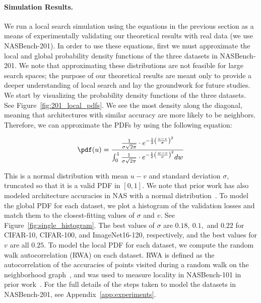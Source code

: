 \paragraph{Simulation Results.}
We run a local search simulation using the equations in
the previous section
as a means of experimentally validating our theoretical results
with real data (we use NASBench-201).
In order to use these equations, first we must approximate the local
and global probability density functions of the three 
datasets in NASBench-201.
We note that approximating these distributions are not feasible for large search
spaces; the purpose of our theoretical results are meant only to provide a deeper
understanding of local search and lay the groundwork for future studies.
We start by visualizing the probability density functions of the three datasets.
See Figure~\ref{fig:201_local_pdfs}.
We see the most density along the diagonal, meaning that architectures
with similar accuracy are more likely to be neighbors.
Therefore, we can approximate the PDFs by using the following equation:






\begin{equation}
\pdf(u)=\frac{
\frac{1}{\sigma\sqrt{2\pi}}\cdot 
e^{-\frac{1}{2}\left(\frac{u-v}{\sigma}\right)^2}
}
{
\int_0^1 \frac{1}{\sigma\sqrt{2\pi}}\cdot 
e^{-\frac{1}{2}\left(\frac{w-v}{\sigma}\right)^2}dw
}
\label{eq:normal_pdf}
\end{equation}



This is a normal distribution with mean $u-v$ 
and standard deviation $\sigma$, truncated so that it is a valid PDF
in $[0,1].$
We note that prior work has also modeled architecture accuracies in NAS with
a normal distribution~\citep{real2019regularized}.
To model the global PDF for each dataset,
we plot a histogram of the validation losses and match them to the closest-fitting
values of $\sigma$ and $v$.
See Figure~\ref{fig:single_histogram}.
The best values of $\sigma$ are $0.18,~0.1,$ and $0.22$ for CIFAR-10, CIFAR-100, 
and ImageNet16-120, respectively, and the best values for $v$ are all $0.25$.
To model the local PDF for each dataset, we compute
the random walk autocorrelation (RWA) on each dataset.
RWA is defined as the autocorrelation of the accuracies of points visited during a
random walk on the neighborhood 
graph~\citep{weinberger1990correlated, stadler1996landscapes},
and was used to measure locality in NASBench-101 in prior work~\citep{nasbench}.
For the full details of the steps taken to model the datasets in NASBench-201, 
see Appendix~\ref{app:experiments}.






